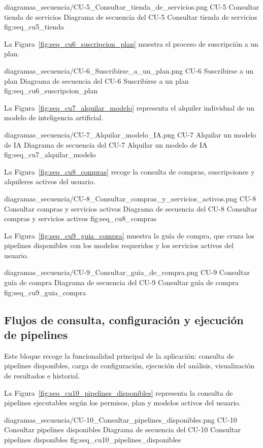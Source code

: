 \diagramaSecuencia
{diagramas_secuencia/CU-5_Consultar_tienda_de_servicios.png}
{CU-5 Consultar tienda de servicios}
{Diagrama de secuencia del CU-5 Consultar tienda de servicios}
{fig:seq_cu5_tienda}

La Figura~\ref{fig:seq_cu6_suscripcion_plan} muestra el proceso de suscripción a un plan.

\diagramaSecuencia
{diagramas_secuencia/CU-6_Suscribirse_a_un_plan.png}
{CU-6 Suscribirse a un plan}
{Diagrama de secuencia del CU-6 Suscribirse a un plan}
{fig:seq_cu6_suscripcion_plan}

La Figura~\ref{fig:seq_cu7_alquilar_modelo} representa el alquiler individual de un modelo de inteligencia artificial.

\diagramaSecuencia
{diagramas_secuencia/CU-7_Alquilar_modelo_IA.png}
{CU-7 Alquilar un modelo de IA}
{Diagrama de secuencia del CU-7 Alquilar un modelo de IA}
{fig:seq_cu7_alquilar_modelo}

La Figura~\ref{fig:seq_cu8_compras} recoge la consulta de compras, suscripciones y alquileres activos del usuario.

\diagramaSecuencia
{diagramas_secuencia/CU-8_Consultar_compras_y_servicios_activos.png}
{CU-8 Consultar compras y servicios activos}
{Diagrama de secuencia del CU-8 Consultar compras y servicios activos}
{fig:seq_cu8_compras}

La Figura~\ref{fig:seq_cu9_guia_compra} muestra la guía de compra, que cruza los pipelines disponibles con los modelos requeridos y los servicios activos del usuario.

\diagramaSecuencia
{diagramas_secuencia/CU-9_Consultar_guia_de_compra.png}
{CU-9 Consultar guía de compra}
{Diagrama de secuencia del CU-9 Consultar guía de compra}
{fig:seq_cu9_guia_compra}

\subsection{Flujos de consulta, configuración y ejecución de pipelines}

Este bloque recoge la funcionalidad principal de la aplicación: consulta de pipelines disponibles, carga de configuración, ejecución del análisis, visualización de resultados e historial.

La Figura~\ref{fig:seq_cu10_pipelines_disponibles} representa la consulta de pipelines ejecutables según los permisos, plan y modelos activos del usuario.

\diagramaSecuencia
{diagramas_secuencia/CU-10_Consultar_pipelines_disponibles.png}
{CU-10 Consultar pipelines disponibles}
{Diagrama de secuencia del CU-10 Consultar pipelines disponibles}
{fig:seq_cu10_pipelines_disponibles}

